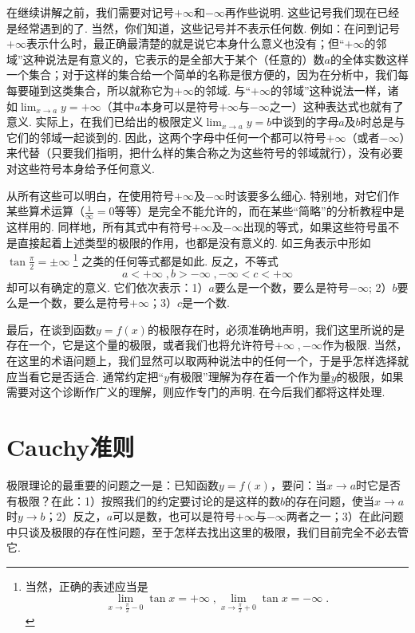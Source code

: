 \documentclass[color=cyan,mathpazo,titlestyle=hang]{elegantbook_mac}
\begin{document}
在继续讲解之前，我们需要对记号$+\infty$和$-\infty$再作些说明. 这些记号我们现在已经是经常遇到的了. 当然，你们知道，这些记号并不表示任何数. 例如：在问到记号$+\infty$表示什么时，最正确最清楚的就是说它本身什么意义也没有；但``$+\infty$的邻域''这种说法是有意义的，它表示的是全部大于某个（任意的）数$a$的全体实数这样一个集合；对于这样的集合给一个简单的名称是很方便的，因为在分析中，我们每每要碰到这类集合，所以就称它为$+\infty$的邻域. 与``$+\infty$的邻域''这种说法一样，诸如$\lim_{x\to a}y = +\infty$（其中$a$本身可以是符号$+\infty$与$-\infty$之一）这种表达式也就有了意义. 实际上，在我们已给出的极限定义$\lim_{x\to a}y = b$中谈到的字母$a$及$b$时总是与它们的邻域一起谈到的. 因此，这两个字母中任何一个都可以符号$+\infty$（或者$-\infty$）来代替（只要我们指明，把什么样的集合称之为这些符号的邻域就行），没有必要对这些符号本身给予任何意义. 

从所有这些可以明白，在使用符号$+\infty$及$-\infty$时该要多么细心. 特别地，对它们作某些算术运算（$\frac{1}{\infty} = 0$等等）是完全不能允许的，而在某些``简略''的分析教程中是这样用的. 同样地，所有其式中有符号$+\infty$及$-\infty$出现的等式，如果这些符号虽不是直接起着上述类型的极限的作用，也都是没有意义的. 如三角表示中形如$\tan{\frac{\pi}{2}} = \pm \infty$ \footnote{当然，正确的表述应当是$$\lim_{x\to \frac{\pi}{2}-0 }\tan{x} = +\infty\; , \lim_{x\to \frac{\pi}{2}+0} \tan{x} = -\infty\; .$$} 之类的任何等式都是如此. 反之，不等式
$$a<+\infty\; , b>-\infty\; , -\infty < c < +\infty$$
却可以有确定的意义. 它们依次表示：1）$a$要么是一个数，要么是符号$-\infty$; 2）$b$要么是一个数，要么是符号$+\infty$；3）$c$是一个数. 

最后，在谈到函数$y=f(x)$的极限存在时，必须准确地声明，我们这里所说的是存在一个，它是这个量的极限，或者我们也将允许符号$+\infty\; , -\infty$作为极限. 当然，在这里的术语问题上，我们显然可以取两种说法中的任何一个，于是乎怎样选择就应当看它是否适合. 通常约定把``$y$有极限''理解为存在着一个作为量$y$的极限，如果需要对这个诊断作广义的理解，则应作专门的声明. 在今后我们都将这样处理. 

\section{Cauchy准则}

极限理论的最重要的问题之一是：已知函数$y=f(x)$，要问：当$x\to a$时它是否有极限？在此：1）按照我们的约定要讨论的是这样的数$b$的存在问题，使当$x\to a$时$y\to b$；2）反之，$a$可以是数，也可以是符号$+\infty$与$-\infty$两者之一；3）在此问题中只谈及极限的存在性问题，至于怎样去找出这里的极限，我们目前完全不必去管它. 
\end{document}
